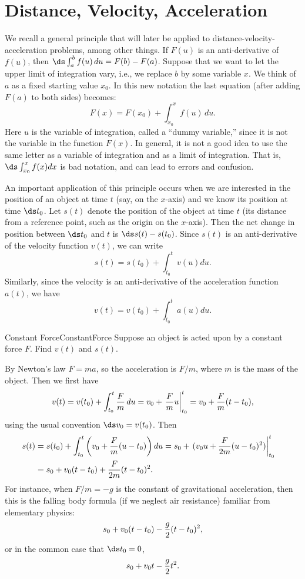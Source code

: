 \section{Distance, Velocity, Acceleration}\label{sec:IntVel}
We recall a general principle that will later be applied to
distance-velocity-acceleration problems, among other things.  If $F(u)$ is
an anti-derivative of $f(u)$, then $\ds \int_a^bf(u)\,du=F(b)-F(a)$.  Suppose
that we want to let the upper limit of integration vary, i.e., we replace
$b$ by some variable $x$.  We think of $a$ as a fixed starting value $x_0$.
In this new notation the last equation (after adding $F(a)$ to both sides)
becomes: 
$$
  F(x)=F(x_0)+\int_{x_0}^xf(u)\,du.
$$ 
Here $u$ is the variable of
integration, called a ``dummy variable,'' since it is not the variable in
the function $F(x)$.  In general, it is not a good idea to use the same
letter as a variable of integration and as a limit of integration.  That
is, $\ds \int_{x_0}^xf(x)dx$ is bad notation, and can lead to errors and
confusion.

An important application of this principle occurs when we are
interested in the position of an object at time $t$ (say, on the
$x$-axis) and we know its position at time $\ds t_0$.  Let $s(t)$ denote
the position of the object at time $t$ (its distance from a reference
point, such as the origin on the $x$-axis).  Then the net change in
position between $\ds t_0$ and $t$ is $\ds s(t)-s(t_0)$.  Since $s(t)$ is an
anti-derivative of the velocity function $v(t)$, we can write
$$
  s(t)=s(t_0)+\int_{t_0}^tv(u)du.
$$
Similarly, since the velocity is an anti-derivative of the acceleration
function $a(t)$, we have 
$$
  v(t)=v(t_0)+\int_{t_0}^ta(u)du.
$$

\begin{example}{Constant Force}{ConstantForce}
Suppose an object is acted upon by a constant
force $F$.  Find $v(t)$ and $s(t)$.
\end{example}

\begin{solution} 
By Newton's law $F=ma$, so the acceleration is
$F/m$, where $m$ is the mass of the object.  Then we first have
$$
  v(t)=v(t_0)+\int_{t_0}^t{F\over m}\,du=v_0+
  \left.{F\over m}u\right|_{t_0}^t=v_0+{F\over m}(t-t_0),
$$ 
using the usual convention $\ds v_0=v(t_0)$.
Then
\begin{eqnarray*}
  s(t)&=s(t_0)+\int_{t_0}^t\left(v_0+{F\over m}(u-t_0)\right)du=s_0+
  \left.(v_0u+{F\over2m}(u-t_0)^2)\right|_{t_0}^t\cr
      &=s_0+v_0(t-t_0)+{F\over2m}(t-t_0)^2.\cr
\end{eqnarray*}
For instance, when $F/m=-g$ is the constant of gravitational acceleration,
then this is the falling body formula (if we neglect air resistance)
familiar from elementary physics:
$$s_0+v_0(t-t_0)-{g\over2}(t-t_0)^2,$$
or in the common case that $\ds t_0=0$,
$$s_0+v_0t-{g\over2}t^2.$$
\end{solution}

